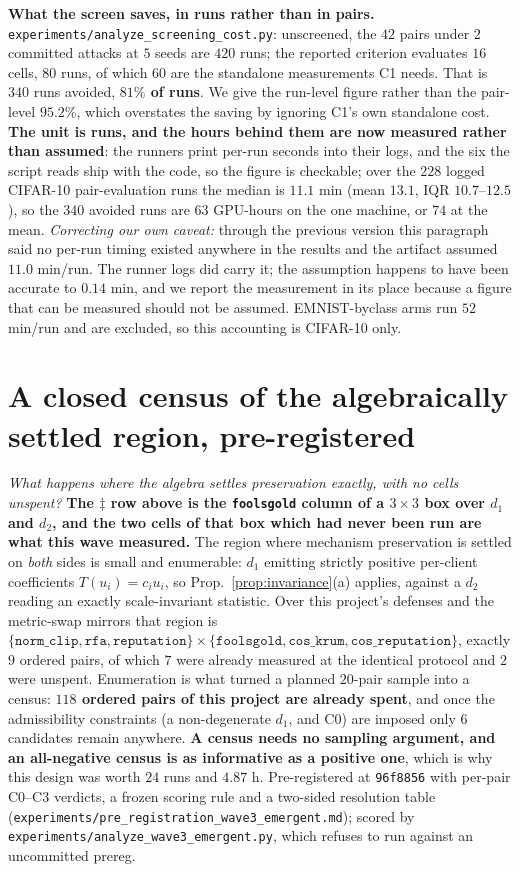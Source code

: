 \documentclass{article}
\begin{document}
\noindent \textbf{What the screen saves, in runs rather than in pairs.}
\texttt{experiments/analyze\_screening\_cost.py}: unscreened, the $42$ pairs under $2$ committed
attacks at $5$ seeds are $420$ runs; the reported criterion evaluates $16$ cells, $80$ runs, of which
$60$ are the standalone measurements C1 needs. That is $340$ runs avoided, \textbf{$81\%$ of runs}. We
give the run-level figure rather than the pair-level $95.2\%$, which overstates the saving by ignoring
C1's own standalone cost. \textbf{The unit is runs, and the hours behind them are now measured
rather than assumed}: the runners print per-run seconds into their logs, and the six the script reads ship with the code,
so the figure is checkable; over the $228$ logged
CIFAR-10 pair-evaluation runs the median is $11.1$ min (mean $13.1$, IQR $10.7$--$12.5$), so the
$340$ avoided runs are $63$ GPU-hours on the one machine, or $74$ at the mean. \emph{Correcting our
own caveat:} through the previous version this paragraph said no per-run timing existed anywhere in
the results and the artifact assumed $11.0$ min/run. The runner logs did carry it; the assumption
happens to have been accurate to $0.14$ min, and we report the measurement in its place because a
figure that can be measured should not be assumed. EMNIST-byclass arms run $52$ min/run and are
excluded, so this accounting is CIFAR-10 only.

\section{A closed census of the algebraically settled region, pre-registered}
\label{app:census}

\noindent \emph{What happens where the algebra settles preservation exactly, with no cells unspent?}
\textbf{The $\ddagger$ row above is the \texttt{foolsgold} column of a $3\times3$ box over $d_1$ and
$d_2$, and the two cells of that box which had never been run are what this wave measured.} The region where mechanism preservation is
settled on \emph{both} sides is small and enumerable: $d_1$ emitting strictly positive per-client
coefficients $T(u_i) = c_iu_i$, so Prop.~\ref{prop:invariance}(a) applies, against a $d_2$ reading an
exactly scale-invariant statistic. Over this project's defenses and the metric-swap mirrors that
region is $\{\texttt{norm\_clip},\texttt{rfa},\texttt{reputation}\} \times
\{\texttt{foolsgold},\texttt{cos\_krum},\texttt{cos\_reputation}\}$, exactly $9$ ordered pairs, of
which $7$ were already measured at the identical protocol and $2$ were unspent. Enumeration is what
turned a planned $20$-pair sample into a census: \textbf{$118$ ordered pairs of this project are
already spent}, and once the admissibility constraints (a non-degenerate $d_1$, and C0) are imposed
only $6$ candidates remain anywhere. \textbf{A census needs no sampling argument, and an all-negative
census is as informative as a positive one}, which is why this design was worth $24$ runs and
$4.87$ h. Pre-registered at \texttt{96f8856} with per-pair C0--C3 verdicts, a frozen
scoring rule and a two-sided resolution table
(\texttt{experiments/pre\_registration\_wave3\_emergent.md}); scored by
\texttt{experiments/analyze\_wave3\_emergent.py}, which refuses to run against an uncommitted prereg.
\end{document}
